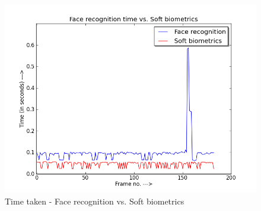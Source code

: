 \documentclass[12pt]{article}			%
\begin{document}
\begin{figure}
	\caption{Time taken - Face recognition vs. Soft biometrics}
	\centering
		\includegraphics[scale=0.6]{img/face_vs_soft.png}
\end{figure}
\end{document}
